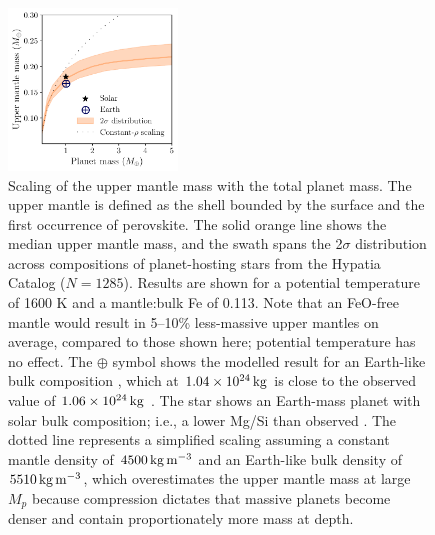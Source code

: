 \documentclass[fleqn,usenatbib]{mnras}
\begin{document}
\begin{figure}
    \centering
    \includegraphics[width=0.4\textwidth]{pops_dist_M_p_mass_um.pdf}
    \caption{Scaling of the upper mantle mass with the total planet mass. The upper mantle is defined as the shell bounded by the surface and the first occurrence of perovskite. The solid orange line shows the median upper mantle mass, and the swath spans the 2$\sigma$ distribution across compositions of planet-hosting stars from the Hypatia Catalog ($N = 1285$). Results are shown for a potential temperature of 1600 K and a mantle:bulk Fe of 0.113. Note that an FeO-free mantle would result in 5--10\% less-massive upper mantles on average, compared to those shown here; potential temperature has no effect. The $\oplus$ symbol shows the modelled result for an Earth-like bulk composition \citep{mcdonough_composition_1995}, which at $1.04 \times 10^{24}\,{\rm kg}$ is close to the observed value of $1.06 \times 10^{24}\,{\rm kg}$ \citep{nolet_earths_2011}. The star shows an Earth-mass planet with solar bulk composition; i.e., a lower Mg/Si than observed \citep{lodders_abundances_2009}. The dotted line represents a simplified scaling assuming a constant mantle density of $4500\,{\rm kg\,m^{-3}}$ and an Earth-like bulk density of $5510\,{\rm kg\,m^{-3}}$, which overestimates the upper mantle mass at large $M_p$ because compression dictates that massive planets become denser and contain proportionately more mass at depth.}
    \label{fig:mass_um}
\end{figure}
\end{document}
